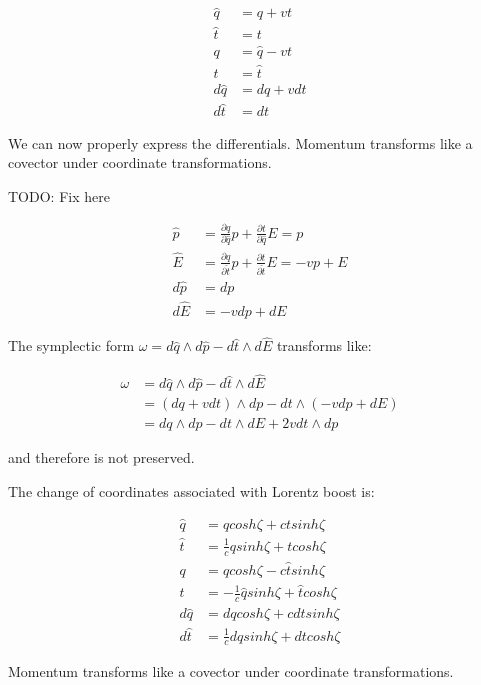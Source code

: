 \documentclass[aps,pra,10pt,twocolumn,floatfix,nofootinbib]{revtex4-1}
\theoremstyle{definition}
\begin{document}
\begin{align*}
\hat{q} &= q + vt \\
\hat{t} &= t \\
q &= \hat{q} - vt \\
t &= \hat{t} \\
d\hat{q} &= dq + v dt \\
d\hat{t} &= dt
\end{align*}

We can now properly express the differentials. Momentum transforms like a covector under coordinate transformations.

TODO: Fix here

\begin{align*}
\hat{p} &= \frac{\partial q}{\partial \hat{q}} p + \frac{\partial t}{\partial \hat{q}} E = p \\
\hat{E} &= \frac{\partial q}{\partial \hat{t}} p + \frac{\partial t}{\partial \hat{t}} E = -vp + E \\
d \hat{p} &= dp \\
d \hat{E} &= -v dp + dE
\end{align*}

The symplectic form $\omega = d\hat{q} \wedge d\hat{p} - d\hat{t} \wedge d\hat{E}$ transforms like:

\begin{align*}
\omega &= d\hat{q} \wedge d\hat{p} - d\hat{t} \wedge d\hat{E} \\
&= (dq + v dt) \wedge dp - dt \wedge (-v dp + dE)\\
&= dq \wedge dp - dt \wedge dE + 2v dt \wedge dp
\end{align*}

and therefore is not preserved.

The change of coordinates associated with Lorentz boost is:

\begin{align*}
\hat{q} &= q cosh \zeta  + ct sinh \zeta  \\
\hat{t} &= \frac{1}{c} q sinh \zeta + t cosh \zeta \\
q &= \hat{q} cosh \zeta - c\hat{t} sinh \zeta \\
t &= - \frac{1}{c} \hat{q} sinh \zeta + \hat{t} cosh \zeta \\
d\hat{q} &= dq cosh \zeta  + cdt sinh \zeta \\
d\hat{t} &= \frac{1}{c} dq sinh \zeta + dt cosh \zeta
\end{align*}

Momentum transforms like a covector under coordinate transformations.
\end{document}
